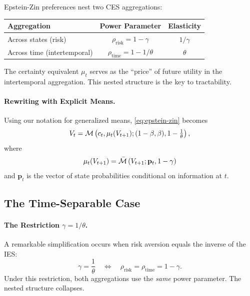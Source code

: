 \begin{calloutimportant}
Epstein-Zin preferences nest two CES aggregations:
\begin{center}
\begin{tabular}{@{}lcc@{}}
\toprule
\textbf{Aggregation} & \textbf{Power Parameter} & \textbf{Elasticity} \\
\midrule
Across states (risk) & $\rho_{\text{risk}} = 1 - \gamma$ & $1/\gamma$ \\
Across time (intertemporal) & $\rho_{\text{time}} = 1 - 1/\theta$ & $\theta$ \\
\bottomrule
\end{tabular}
\end{center}
The certainty equivalent $\mu_t$ serves as the ``price'' of future utility in the intertemporal aggregation. This nested structure is the key to tractability.
\end{calloutimportant}

\paragraph{Rewriting with Explicit Means.}

Using our notation for generalized means, \eqref{eq:epstein-zin} becomes
\begin{equation}
V_t = \mathcal{M}\left( c_t, \mu_t(V_{t+1}); (1-\beta, \beta), 1-\tfrac{1}{\theta} \right),
\label{eq:ez-as-mean}
\end{equation}
where
\begin{equation}
\mu_t(V_{t+1}) = \bar{\mathcal{M}}\left( V_{t+1}; \mathbf{p}_t, 1-\gamma \right)
\label{eq:mu-as-mean}
\end{equation}
and $\mathbf{p}_t$ is the vector of state probabilities conditional on information at $t$.

\subsection{The Time-Separable Case}
\label{subsec:time-separable}

\paragraph{The Restriction $\gamma = 1/\theta$.}

A remarkable simplification occurs when risk aversion equals the inverse of the IES:
\begin{equation}
\gamma = \frac{1}{\theta} \quad \Longleftrightarrow \quad \rho_{\text{risk}} = \rho_{\text{time}} = 1 - \gamma.
\label{eq:ez-restriction}
\end{equation}
Under this restriction, both aggregations use the \emph{same} power parameter. The nested structure collapses.

